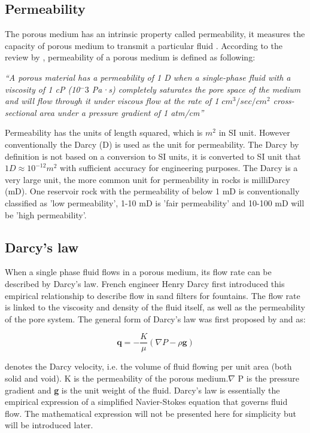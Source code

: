 \subsection{Permeability}
The porous medium has an intrinsic property called permeability, it measures the capacity of porous medium to transmit a particular fluid \citep{peters2012overview}. According to the review by \citet{honarpour2018relative}, permeability of a porous medium is defined as following: 

\textit{``A porous material has a permeability of 1 D when a single-phase fluid with a viscosity of 1 cP (10$^-3$ Pa·s) completely saturates the pore space of the medium and will flow through it under viscous flow at the rate of 1 $cm^3/sec/cm^2$ cross-sectional area under a pressure
gradient of 1 atm/cm''} 

Permeability has the units of length squared, which is $m^2$ in SI unit. However conventionally the Darcy (D) is used as the unit for permeability. The Darcy by definition is not based on a conversion to SI units, it is converted to SI unit that $1D \approx 10^{-12} m^2$ with sufficient accuracy for engineering purposes. The Darcy is a very large unit, the more common unit for permeability in rocks is milliDarcy (mD). One reservoir rock with the permeability of below 1 mD is conventionally classified as 'low permeability', 1-10 mD is 'fair permeability' and 10-100 mD will be 'high permeability'.

\subsection{Darcy's law}
When a single phase fluid flows in a porous medium, its flow rate can be described by Darcy's law. French engineer Henry Darcy \citeyear{darcy1856public} first introduced this empirical relationship to describe flow in sand filters for fountains. The flow rate is linked to the viscosity and density of the fluid itself, as well as the permeability of the pore system. The general form of Darcy's law was first proposed by \citet{nutting1930physical} and \citet{wyckoff1933measurement} as:

\begin{equation}
    \mathbf{q}=-\frac{K}{\mu }(\nabla P-\rho \textbf{g})
\end{equation}

 denotes the Darcy velocity, i.e. the volume of fluid flowing per unit area (both solid and void). K is the permeability of the porous medium.$\nabla$ P is the pressure gradient and \textrho \textbf{g} is the unit weight of the fluid. Darcy's law is essentially the empirical expression of a simplified Navier-Stokes equation that governs fluid flow. The mathematical expression will not be presented here for simplicity but will be introduced later.

